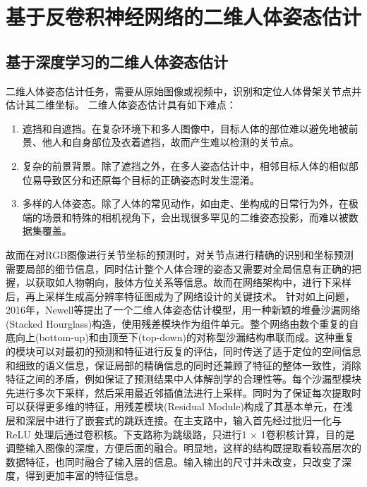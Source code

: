 
\chapter{基于反卷积神经网络的二维人体姿态估计}

\section{基于深度学习的二维人体姿态估计}
二维人体姿态估计任务，需要从原始图像或视频中，识别和定位人体骨架关节点并估计其二维坐标。
二维人体姿态估计具有如下难点：
\begin{enumerate}
    \item 遮挡和自遮挡。在复杂环境下和多人图像中，目标人体的部位难以避免地被前景、他人和自身部位及衣着遮挡，故而产生难以检测的关节点。
    \item 复杂的前景背景。除了遮挡之外，在多人姿态估计中，相邻目标人体的相似部位易导致区分和还原每个目标的正确姿态时发生混淆。
    \item 多样的人体姿态。除了人体的常见动作，如由走、坐构成的日常行为外，在极端的场景和特殊的相机视角下，会出现很多罕见的二维姿态投影，而难以被数据集覆盖。
\end{enumerate}
故而在对RGB图像进行关节坐标的预测时，对关节点进行精确的识别和坐标预测需要局部的细节信息，同时估计整个人体合理的姿态又需要对全局信息有正确的把握，以获取如人物朝向，肢体方位关系等信息。故而在网络架构中，进行下采样后，再上采样生成高分辨率特征图成为了网络设计的关键技术。
针对如上问题，2016年，Newell等提出了一个二维人体姿态估计模型，用一种新颖的堆叠沙漏网络(Stacked Hourglass)构造，使用残差模块作为组件单元。整个网络由数个重复的自底向上(bottom-up)和由顶至下(top-down)的对称型沙漏结构串联而成。这种重复的模块可以对最初的预测和特征进行反复的评估，同时传送了适于定位的空间信息和细致的语义信息，保证局部的精确信息的同时还兼顾了特征的整体一致性，消除特征之间的矛盾，例如保证了预测结果中人体解剖学的合理性等。每个沙漏型模块先进行多次下采样，然后采用最近邻插值法进行上采样。同时为了保证每次提取时可以获得更多维的特征，用残差模块(Residual Module)构成了其基本单元，在浅层和深层中进行了嵌套式的跳跃连接。在主支路中，输入首先经过批归一化与 ReLU 处理后通过卷积核。下支路称为跳级路，只进行1 × 1卷积核计算，目的是调整输入图像的深度，方便后面的融合。明显地，这样的结构既提取看较高层次的数据特征，也同时融合了输入层的信息。输入输出的尺寸并未改变，只改变了深度，得到更加丰富的特征信息。

